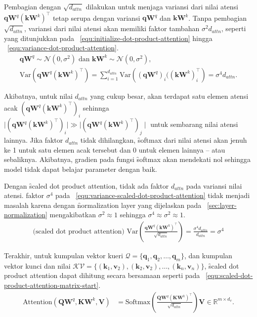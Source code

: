 	Pembagian dengan $\sqrt{d_{attn}}$ dilakukan untuk menjaga variansi dari nilai atensi $\mathbf{q} \mathbf{W}^q (\mathbf{k} \mathbf{W}^k)^{\top}$ tetap serupa dengan variansi $\mathbf{qW}^q$ dan $\mathbf{kW}^k$. Tanpa pembagian $\sqrt{d_{attn}}$, variansi dari nilai atensi akan memiliki faktor tambahan $\sigma^2 d_{attn}$, seperti yang ditunjukkan pada \equ~\ref{equ:initialize-dot-product-attention} hingga \equ~\ref{equ:variance-dot-product-attention}.
	\begin{align}
		\label{equ:initialize-dot-product-attention}
		\mathbf{qW}^q \sim \mathcal{N}(0, \sigma^2) \text{ dan } \mathbf{kW}^k \sim \mathcal{N}(0, \sigma^2), \\
		\label{equ:variance-dot-product-attention}
		\text{Var}(\mathbf{qW}^q (\mathbf{kW}^k)^{\top}) = \sum_{i=1}^{d_{attn}} \text{Var}\left((\mathbf{qW}^q)_i ((\mathbf{kW}^k)^{\top}_i\right) = \sigma^4 d_{attn}.
	\end{align}
	
	Akibatnya, untuk nilai $d_{attn}$ yang cukup besar, akan terdapat satu elemen atensi acak $(\mathbf{qW}^q (\mathbf{kW}^k)^{\top})_i$ sehinnga $\mid (\mathbf{qW}^q (\mathbf{kW}^k)^{\top})_i\mid \gg \mid(\mathbf{qW}^q (\mathbf{kW}^k)^{\top})_j\mid$ untuk sembarang nilai atensi lainnya. Jika faktor $d_{attn}$ tidak dihilangkan, \f{softmax} dari nilai atensi akan jenuh ke 1 untuk satu elemen acak tersebut dan 0 untuk elemen lainnya -- atau sebaliknya. Akibatnya, gradien pada fungsi \f{softmax} akan mendekati nol sehingga model tidak dapat belajar parameter dengan baik. 

	Dengan \f{scaled dot product attention}, tidak ada faktor $d_{attn}$ pada variansi nilai atensi. faktor $\sigma^4$ pada \equ~\ref{equ:variance-scaled-dot-product-attention} tidak menjadi masalah karena dengan \f{normalization layer} yang dijelaskan pada \sect~\ref{sec:layer-normalization} mengakibatkan $\sigma^2 \approx 1$ sehingga $\sigma^4 \approx \sigma^2 \approx 1$.
	\begin{align}
		\label{equ:variance-scaled-dot-product-attention}
		\text{(scaled dot product attention) }\text{Var}\left(\frac{\mathbf{qW}^q (\mathbf{kW}^k)^{\top}}{\sqrt{d_{attn}}}\right) = \frac{\sigma^4 d_{attn}}{d_{attn}} = \sigma^4
	\end{align}

	Terakhir, untuk kumpulan vektor kueri $\mathcal{Q} = \{\mathbf{q}_1, \mathbf{q}_2, \dots, \mathbf{q}_m\}$, dan kumpulan vektor kunci dan nilai $\mathcal{KV} = \{(\mathbf{k}_1, \mathbf{v}_2), (\mathbf{k}_2, \mathbf{v}_2), \dots, (\mathbf{k}_n, \mathbf{v}_n)\}$, \f{scaled dot product attention} dapat dihitung secara bersamaan seperti pada \equ~\ref{equ:scaled-dot-product-attention-matrix-start}.
	\begin{align}
	\label{equ:scaled-dot-product-attention-matrix-start}
	\text{Attention}(\mathbf{QW}^q, \mathbf{KW}^k, \mathbf{V}) &= \text{Softmax}( \frac{\mathbf{QW}^q (\mathbf{KW}^k)^{\top}}{\sqrt{d_{attn}}}) \mathbf{V} \in \mathbb{R}^{m \times d_{v}}.
	\end{align}

